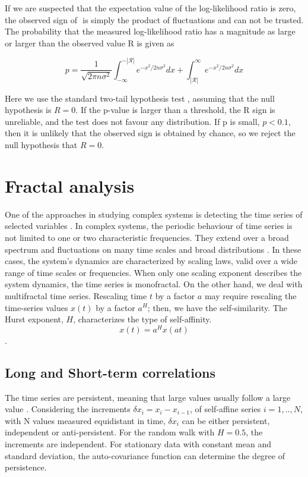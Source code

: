 If we are suspected that the expectation value of the log-likelihood ratio is zero, the observed sign of $\mathcal {} $ is simply the product of fluctuations and can not be trusted. The probability that the measured log-likelihood ratio has a magnitude as large or larger than the observed value R is given as

\begin{equation}
p = \frac{1}{\sqrt{2\pi n \sigma^2}} \int_{-\infty}^{-|\mathcal{R}|}e^{-x^2/2n\sigma^2}dx + \int_{|\mathcal{R}|}^{\infty}e^{-x^2/2n\sigma^2}dx
\end{equation}

Here we use the standard two-tail hypothesis test \cite{clauset2009power}, assuming that the null hypothesis is  $R= 0$. If the p-value is larger than a threshold, the R sign is unreliable, and the test does not favour any distribution. If p is small, $p<0.1$, then it is unlikely that the observed sign is obtained by chance, so we reject the null hypothesis that $R=0$. 

\section{Fractal analysis}

One of the approaches in studying complex systems is detecting the time series of selected variables \cite{kantelhardt2008fractal}. In complex systems, the periodic behaviour of time series is not limited to one or two characteristic frequencies. They extend over a broad spectrum and fluctuations on many time scales and broad distributions \cite{fan2012fractal, sidorov2018fractality}. In these cases, the system's dynamics are characterized by scaling laws, valid over a wide range of time scales or frequencies. When only one scaling exponent describes the system dynamics, the time series is monofractal.
On the other hand, we deal with multifractal time series. Rescaling time $t$ by a factor $a$ may require rescaling the time-series values $x(t)$ by a factor $a^H$; then, we have the self-similarity. The Hurst exponent, $H$, characterizes the type of self-affinity. 
$$x(t) = a^Hx(at)$$. 

\subsection{Long and Short-term correlations}
The time series are persistent, meaning that large values usually follow a large value \cite{kantelhardt2008fractal}. Considering the increments $\delta x_i = x_i - x_{i-1}$, of self-affine series $i = 1,.., N$, with N values measured equidistant in time, $\delta x_i$ can be either persistent, independent or anti-persistent. For the random walk with $H=0.5$, the increments are independent. For stationary data with constant mean and standard deviation, the auto-covariance function can determine the degree of persistence. 

